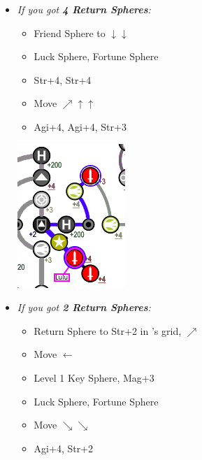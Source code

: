\begin{spheregrid}
    \begin{itemize}
            \yunaf
            \begin{itemize}
              \item \textit{If you got \textbf{4 Return Spheres}:}
                    \begin{itemize}
                      \item Friend Sphere to \lulu $\downarrow\downarrow$
                      \item Luck Sphere, Fortune Sphere
                      \item Str+4, Str+4
                      \item Move $\nearrow\uparrow\uparrow$
                      \item Agi+4, Agi+4, Str+3
                    \end{itemize}
                    \includegraphics[width=.5\columnwidth]{graphics/4_returns_w_luck_pt1}
                    \columnbreak
              \item \textit{If you got \textbf{2 Return Spheres}:}
                    \begin{itemize}
                      \item Return Sphere to Str+2 in \wakka's grid, $\nearrow$
                      \item Move $\leftarrow$
                      \item Level 1 Key Sphere, Mag+3
                      \item Luck Sphere, Fortune Sphere
                      \item Move $\searrow\searrow$
                      \item Agi+4, Str+2

\end{itemize}
\end{itemize}
\end{itemize}
\end{spheregrid}
